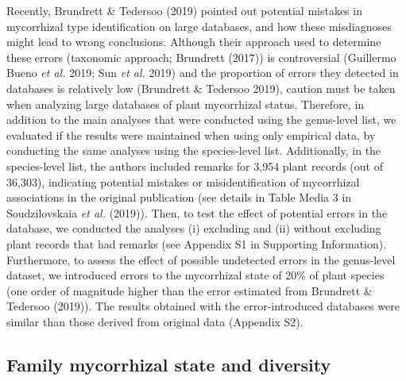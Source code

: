 \documentclass[12pt,]{article}
\begin{document}
Recently, Brundrett \& Tedersoo (2019) pointed out potential mistakes in
mycorrhizal type identification on large databases, and how these
misdiagnoses might lead to wrong conclusions. Although their approach
used to determine these errors (taxonomic approach; Brundrett (2017)) is
controversial (Guillermo Bueno \emph{et al.} 2019; Sun \emph{et al.}
2019) and the proportion of errors they detected in databases is
relatively low (Brundrett \& Tedersoo 2019), caution must be taken when
analyzing large databases of plant mycorrhizal status. Therefore, in
addition to the main analyses that were conducted using the genus-level
list, we evaluated if the results were maintained when using only
empirical data, by conducting the same analyses using the species-level
list. Additionally, in the species-level list, the authors included
remarks for 3,954 plant records (out of 36,303), indicating potential
mistakes or misidentification of mycorrhizal associations in the
original publication (see details in Table Media 3 in Soudzilovskaia
\emph{et al.} (2019)). Then, to test the effect of potential errors in
the database, we conducted the analyses (i) excluding and (ii) without
excluding plant records that had remarks (see Appendix S1 in Supporting
Information). Furthermore, to assess the effect of possible undetected
errors in the genus-level dataset, we introduced errors to the
mycorrhizal state of 20\% of plant species (one order of magnitude
higher than the error estimated from Brundrett \& Tedersoo (2019)). The
results obtained with the error-introduced databases were similar than
those derived from original data (Appendix S2).

\hypertarget{family-mycorrhizal-state-and-diversity}{%
\subsection{Family mycorrhizal state and
diversity}\label{family-mycorrhizal-state-and-diversity}}
\end{document}
